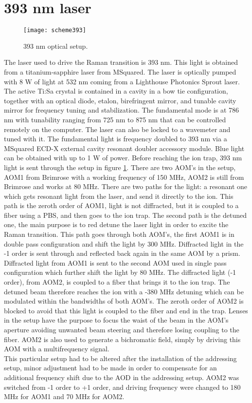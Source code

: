 \section{393 nm laser}
\begin{figure}
\centering
\texttt{[image: scheme393]}
\caption{393 nm optical setup.}
\label{scheme393}
\end{figure}
The laser used to drive the Raman transition is 393 nm. This light is obtained from a titanium-sapphire laser from MSquared. The laser is optically pumped with 8 W of light at 532 nm coming from a Lighthouse Photonics Sprout laser. The active Ti:Sa crystal is contained in a cavity in a bow tie configuration, together with an optical diode, etalon, birefringent mirror, and tunable cavity mirror for frequency tuning and stabilization. The fundamental mode is at 786 nm with tunability ranging from 725 nm to 875 nm that can be controlled remotely on the computer. The laser can also be locked to a wavemeter and tuned with it.
The fundamental light is frequency doubled to 393 nm via a MSquared ECD-X external cavity resonant doubler accessory module. Blue light can be obtained with up to 1 W of power. Before reaching the ion trap, 393 nm light is sent through the setup in figure \ref{scheme393}. There are two AOM's in the setup, AOM1 from Brimrose with a working frequency of 150 MHz, AOM2 is still from Brimrose and works at 80 MHz. There are two paths for the light: a resonant one which gets resonant light from the laser, and send it directly to the ion. This path is the zeroth order of AOM1, light is not diffracted, but it is coupled to a fiber using a PBS, and then goes to the ion trap. The second path is the detuned one, the main purpose is to red detune the laser light in order to excite the Raman transition. This path goes through both AOM's, the first AOM1 is in double pass configuration and shift the light by 300 MHz. Diffracted light in the -1 order is sent through and reflected back again in the same AOM by a prism. Diffracted light from AOM1 is sent to the second AOM used in single pass configuration which further shift the light by 80 MHz. The diffracted light (-1 order), from AOM2, is coupled to a fiber that brings it to the ion trap. The detuned beam therefore reaches the ion with a -380 MHz detuning which can be modulated within the bandwidths of both AOM's. The zeroth order of AOM2 is blocked to avoid that this light is coupled to the fiber and end in the trap. Lenses in the setup have the purpose to focus the waist of the beam in the AOM's aperture avoiding unwanted beam steering and therefore losing coupling to the fiber.
AOM2 is also used to generate a bichromatic field, simply by driving this AOM with a multifrequency signal.\\
This particular setup had to be altered after the installation of the addressing setup, minor adjustment had to be made in order to compensate for an additional frequency shift due to the AOD in the addressing setup. AOM2 was switched from -1 order to +1 order, and driving frequency were changed to 180 MHz for AOM1 and 70 MHz for AOM2.


